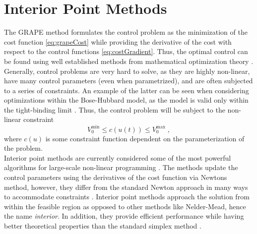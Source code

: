 \section{Interior Point Methods} \label{sec:IntPoint}

The GRAPE method formulates the control problem as the minimization of the cost function \eqref{eq:grapeCost} while providing the derivative of the cost with respect to the control functions \eqref{eq:costGradient}. Thus, the optimal control can be found using well established methods from mathematical optimization theory \cite{deFouquieres2011}. Generally, control problems are very hard to solve, as they are highly non-linear, have many control parameters (even when parametrized), and are often subjected to a series of constraints. An example of the latter can be seen when considering optimizations within the Bose-Hubbard model, as the model is valid only within the tight-binding limit \cite{manybodyBloch}. Thus, the control problem will be subject to the non-linear constraint
\begin{equation}
	 V_{0}^{\mathrm{min}} \leq c (u(t)) \leq V_{0}^{\mathrm{max}} \; ,
\end{equation}
where $c (u)$ is some constraint function dependent on the parameterization of the problem.\\
Interior point methods are currently considered some of the most powerful algorithms for large-scale non-linear programming \cite{wright}. The methods update the control parameters using the derivatives of the cost function via Newtons method, however, they differ from the standard Newton approach in many ways to accommodate constraints \cite{Karmarkar1984,Wachter2006}. Interior point methods approach the solution from within the feasible region as opposed to other methods like Nelder-Mead, hence the name \textit{interior}. In addition, they provide efficient performance while having better theoretical properties than the standard simplex method \cite{wright}.\\

